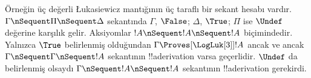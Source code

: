 Örneğin üç değerli Łukasiewicz mantığının üç taraflı bir sekant hesabı
vardır. $\Gamma\nSequent\Pi\nSequent\Delta$ sekantında $\Gamma$, $\False$;
$\Delta$, $\True$; $\Pi$ ise $\Undef$ değerine karşılık gelir. Aksiyomlar
$!A\nSequent !A\nSequent !A$ biçimindedir. Yalnızca $\True$ belirlenmiş
olduğundan $\Gamma\Proves[\LogLuk[3]]!A$ ancak ve ancak
$\Gamma\nSequent\Gamma\nSequent !A$ sekantının !!a{derivation} varsa
geçerlidir. $\Undef$ da belirlenmiş olsaydı
$\Gamma\nSequent !A\nSequent !A$ sekantının !!a{derivation} gerekirdi.

